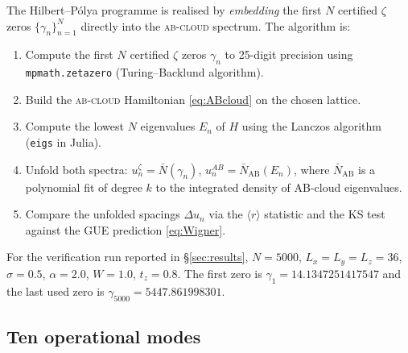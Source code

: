 \documentclass[11pt,a4paper]{article}
\theoremstyle{plain}
\theoremstyle{definition}
\theoremstyle{remark}
\newcommand{\rh}{\langle r\rangle}
\newcommand{\Abcloud}{\textsc{ab-cloud}}
\begin{document}
The Hilbert--Pólya programme is realised by \emph{embedding} the first $N$ certified $\zeta$ zeros $\{\gamma_n\}_{n=1}^N$ directly into the \Abcloud{} spectrum. The algorithm is:
\begin{enumerate}[leftmargin=*,itemsep=2pt]
    \item Compute the first $N$ certified $\zeta$ zeros $\gamma_n$ to 25-digit precision using \texttt{mpmath.zetazero} (Turing--Backlund algorithm).
    \item Build the \Abcloud{} Hamiltonian \eqref{eq:ABcloud} on the chosen lattice.
    \item Compute the lowest $N$ eigenvalues $E_n$ of $H$ using the Lanczos algorithm (\texttt{eigs} in Julia).
    \item Unfold both spectra: $u_n^{\zeta} = \bar N(\gamma_n)$, $u_n^{AB} = \bar N_{\mathrm{AB}}(E_n)$, where $\bar N_{\mathrm{AB}}$ is a polynomial fit of degree $k$ to the integrated density of AB-cloud eigenvalues.
    \item Compare the unfolded spacings $\Delta u_n$ via the $\rh$ statistic and the KS test against the GUE prediction \eqref{eq:Wigner}.
\end{enumerate}
For the verification run reported in \S\ref{sec:results}, $N = 5000$, $L_x = L_y = L_z = 36$, $\sigma = 0.5$, $\alpha = 2.0$, $W = 1.0$, $t_z = 0.8$. The first zero is $\gamma_1 = 14.1347251417547$ and the last used zero is $\gamma_{5000} = 5447.861998301$.

\subsection{Ten operational modes}
\end{document}
